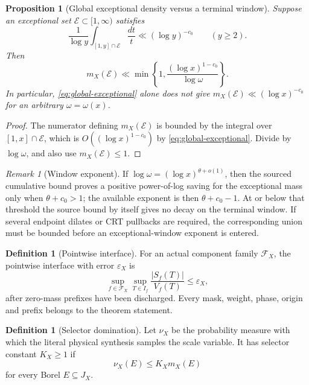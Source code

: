 \documentclass[11pt]{article}
\newtheorem{proposition}[theorem]{Proposition}
\theoremstyle{definition}
\newtheorem{definition}[theorem]{Definition}
\theoremstyle{remark}
\newtheorem{remark}[theorem]{Remark}
\begin{document}
\begin{proposition}[Global exceptional density versus a terminal window]
\label{prop:global-to-window}
Suppose an exceptional set \(\mathcal E\subset[1,\infty)\) satisfies
\begin{equation}
 \frac1{\log y}
 \int_{[1,y]\cap\mathcal E}\frac{dt}{t}
 \ll(\log y)^{-c_0}
 \qquad(y\ge2).
\label{eq:global-exceptional}
\end{equation}
Then
\begin{equation}
 \boxed{
 m_X(\mathcal E)
 \ll
 \min\left\{
 1,\frac{(\log x)^{1-c_0}}{\log\omega}
 \right\}.}
\label{eq:window-exceptional}
\end{equation}
In particular, \eqref{eq:global-exceptional} alone does not give
\(m_X(\mathcal E)\ll(\log x)^{-c_0}\) for an arbitrary
\(\omega=\omega(x)\).
\end{proposition}

\begin{proof}
The numerator defining \(m_X(\mathcal E)\) is bounded by the
integral over \([1,x]\cap\mathcal E\), which is
\(O((\log x)^{1-c_0})\) by
\eqref{eq:global-exceptional}.  Divide by \(\log\omega\), and also
use \(m_X(\mathcal E)\le1\).
\end{proof}

\begin{remark}[Window exponent]
\label{rem:window-exponent}
If
\(\log\omega=(\log x)^{\theta+o(1)}\), then the sourced cumulative
bound proves a positive power-of-log saving for the exceptional
mass only when \(\theta+c_0>1\); the available exponent is then
\(\theta+c_0-1\).  At or below that threshold the source bound by
itself gives no decay on the terminal window.  If several endpoint
dilates or CRT pullbacks are required, the corresponding union must
be bounded before an exceptional-window exponent is entered.
\end{remark}

\begin{definition}[Pointwise interface]
\label{def:pointwise}
For an actual component family \(\mathcal F_X\), the pointwise
interface with error \(\varepsilon_X\) is
\[
 \sup_{f\in\mathcal F_X}
 \sup_{T\in I_f}
 \frac{|S_f(T)|}{V_f(T)}
 \le\varepsilon_X,
\]
after zero-mass prefixes have been discharged.  Every mask, weight,
phase, origin and prefix belongs to the theorem statement.
\end{definition}

\begin{definition}[Selector domination]
\label{def:selector}
Let \(\nu_X\) be the probability measure with which the literal
physical synthesis samples the scale variable.  It has selector
constant \(K_X\ge1\) if
\begin{equation}
 \nu_X(E)\le K_Xm_X(E)
\label{eq:domination}
\end{equation}
for every Borel \(E\subseteq J_X\).
\end{definition}
\end{document}
